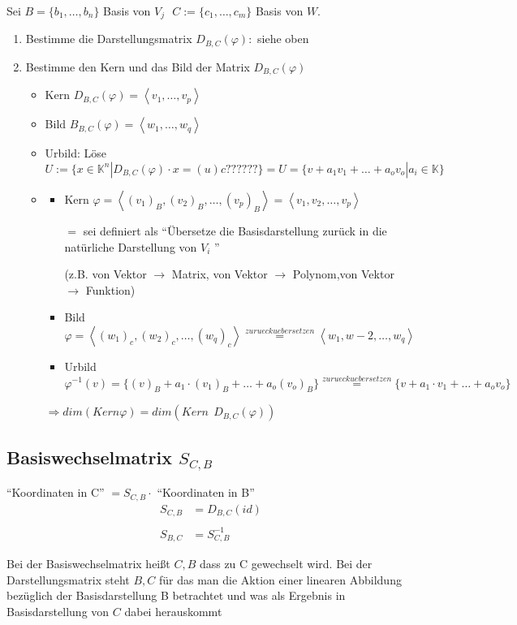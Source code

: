 \documentclass{scrartcl}
\begin{document}
Sei $B=\{b_1, \dots, b_n\}$ Basis von $V_j ~~~ C:= \{c_1, \dots, c_m\}$ Basis von $W$.
\begin{enumerate}
\item Bestimme die Darstellungsmatrix $D_{B,C} (\varphi) : $ siehe oben
\item Bestimme den Kern und das Bild der Matrix $D_{B,C}(\varphi)$
    \begin{itemize}
    \item Kern $D_{B,C}(\varphi) = \left< v_1, \dots, v_p \right>$
    \item Bild $B_{B,C}(\varphi) = \left< w_1, \dots, w_q \right>$
    \item Urbild: Löse 
    \[U := \{x \in \mathbb{K}^n | D_{B,C}(\varphi) \cdot x = (u) c ??????\} = U = \{v + a_1v_1 + \dots + a_ov_o | a_i \in \mathbb{K}\}\]
    \item 
    \begin{itemize}
    \item Kern $\varphi = \left< (v_1)_B, (v_2)_B, \dots, (v_p)_B \right> = \left<v_1, v_2, \dots, v_p \right>$
    \begin{Notiz}
    $ = $ sei definiert als "`Übersetze die Basisdarstellung zurück in die natürliche Darstellung von $V_i$ "'

    (z.B. von Vektor $\rightarrow$ Matrix, von Vektor $\rightarrow$ Polynom,von Vektor $\rightarrow$ Funktion)
    \end{Notiz}
    \item Bild $\varphi = \left< (w_1)_c, (w_2)_c, \dots, (w_q)_c \right>\overset{zurueckuebersetzen}{=} \left<w_1, w-2, \dots, w_q \right>$
    \item Urbild $\varphi^{-1}(v) = \{(v)_B + a_1 \cdot (v_1)_B + \dots + a_o(v_o)_B \} \overset{zurueckuebersetzen}{=} \{v + a_1 \cdot v_1 + \dots + a_ov_o\}$
    \end{itemize}
    $\Rightarrow dim(Kern \varphi) = dim(Kern~~ D_{B,C}(\varphi))$
\end{itemize}
\end{enumerate}

\subsection{Basiswechselmatrix $S_{C,B}$}

\begin{Def}
  "`Koordinaten in C"' $ = S_{C,B} \cdot $ "`Koordinaten in B"'
  \begin{align*}
  S_{C,B} &= D_{B,C}(id)\\
  &~ \\
  S_{B,C} &= S_{C,B}^{-1}
  \end{align*}
  \begin{Notiz}
  Bei der Basiswechselmatrix heißt $C,B$ dass zu C gewechselt wird. Bei der Darstellungsmatrix steht $B,C$ für das man die Aktion einer linearen Abbildung bezüglich der Basisdarstellung B betrachtet und was als Ergebnis in Basisdarstellung von $C$ dabei herauskommt
  \end{Notiz}
\end{Def}
\end{document}
